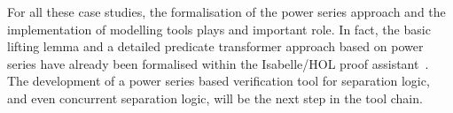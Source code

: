 \documentclass[12pt]{article}
\theoremstyle{definition}
\begin{document}
For all these case studies, the formalisation of the power series
approach and the implementation of modelling tools plays and important
role.  In fact, the basic lifting lemma and a detailed predicate
transformer approach based on power series have already been
formalised within the Isabelle/HOL proof assistant~\cite{NPW02}.  The
development of a power series based verification tool for separation
logic, and even concurrent separation logic, will be the next step in
the tool chain.



\end{document}

